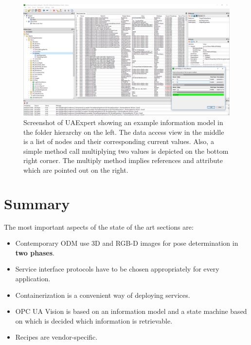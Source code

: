 \begin{landscape}
\begin{figure}[ht]
    \centering
    \includegraphics[width=1.5\textwidth]{img/UAExpertScreenshot.png}
    \caption{Screenshot of UAExpert showing an example information model in the folder hierarchy on the left. The data access view in the middle is a list of nodes and their corresponding current values. Also, a simple method call multiplying two values is depicted on the bottom right corner. The multiply method implies references and attribute which are pointed out on the right.}
    \label{fig:uaexpert}
\end{figure}
\end{landscape}

\section{Summary}
The most important aspects of the state of the art sections are:
\begin{itemize}
    \item Contemporary ODM use 3D and RGB-D images for pose determination in \textbf{two phases}.
    \item Service interface protocols have to be chosen appropriately for every application.
    \item Containerization is a convenient way of deploying services.
    \item OPC UA Vision is based on an information model and a state machine based on which is decided which information is retrievable.
    \item Recipes are vendor-specific.
\end{itemize}
